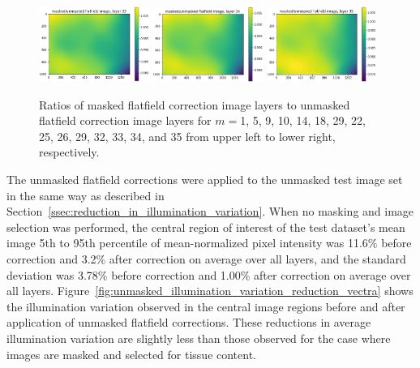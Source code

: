 \documentclass[letterpaper,11pt]{article}
\newcommand{\reffig}[1]{Figure~\ref{#1}}
\newcommand{\refsec}[1]{Section~\ref{#1}}
\begin{document}
\begin{figure}[!ht]
\includegraphics[width=0.32\textwidth]{images/results/masked_over_unmasked_flatfield_image_layers/masked_over_unmasked_flatfield_image_layer_33}
\includegraphics[width=0.32\textwidth]{images/results/masked_over_unmasked_flatfield_image_layers/masked_over_unmasked_flatfield_image_layer_34}
\includegraphics[width=0.32\textwidth]{images/results/masked_over_unmasked_flatfield_image_layers/masked_over_unmasked_flatfield_image_layer_35}
\caption{\footnotesize Ratios of masked flatfield correction image layers to unmasked flatfield correction image layers for $m=$1, 5, 9, 10, 14, 18, 29, 22, 25, 26, 29, 32, 33, 34, and 35 from upper left to lower right, respectively.}
\label{fig:masked_over_unmasked_flatfield_image_layers_vectra}
\end{figure}

The unmasked flatfield corrections were applied to the unmasked test image set in the same way as described in \refsec{ssec:reduction_in_illumination_variation}. When no masking and image selection was performed, the central region of interest of the test dataset's mean image 5th to 95th percentile of mean-normalized pixel intensity was 11.6\% before correction and 3.2\% after correction on average over all layers, and the standard deviation was 3.78\% before correction and 1.00\% after correction on average over all layers. \reffig{fig:unmasked_illumination_variation_reduction_vectra} shows the illumination variation observed in the central image regions before and after application of unmasked flatfield corrections. These reductions in average illumination variation are slightly less than those observed for the case where images are masked and selected for tissue content. 
\end{document}
